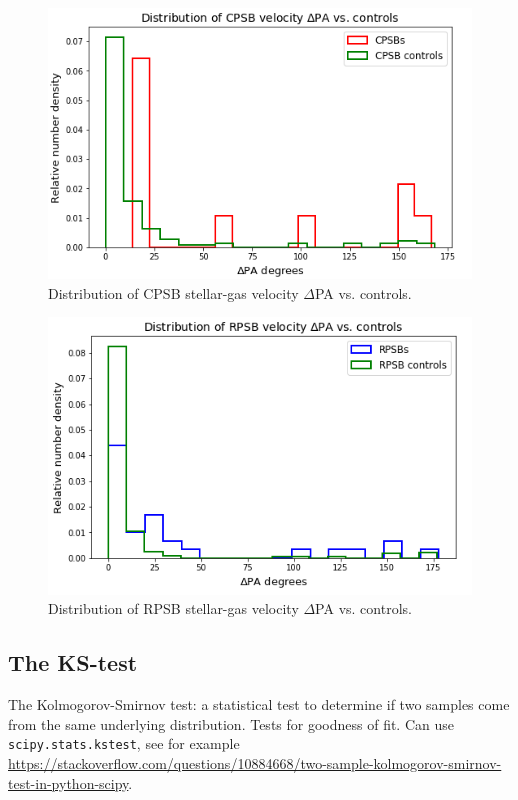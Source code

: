 \begin{figure}
    \centering
    \includegraphics[width=\columnwidth]{images/JupyterPlots/Distribution-of-CPSB-dPA-vs-controls.png}
    \caption{Distribution of CPSB stellar-gas velocity $\Delta$PA vs. controls.}
    \label{fig:CPSBvsControlDeltaPAs}
\end{figure}

\begin{figure}
    \centering
    \includegraphics[width=\columnwidth]{images/JupyterPlots/Distribution-of-RPSB-dPA-vs-controls.png}
    \caption{Distribution of RPSB stellar-gas velocity $\Delta$PA vs. controls.}
    \label{fig:RPSBvsControlDeltaPAs}
\end{figure}

\subsection{The KS-test}
The Kolmogorov-Smirnov test: a statistical test to determine if two samples come from the same underlying distribution. Tests for goodness of fit. Can use \texttt{scipy.stats.kstest}, see for example \url{https://stackoverflow.com/questions/10884668/two-sample-kolmogorov-smirnov-test-in-python-scipy}.

